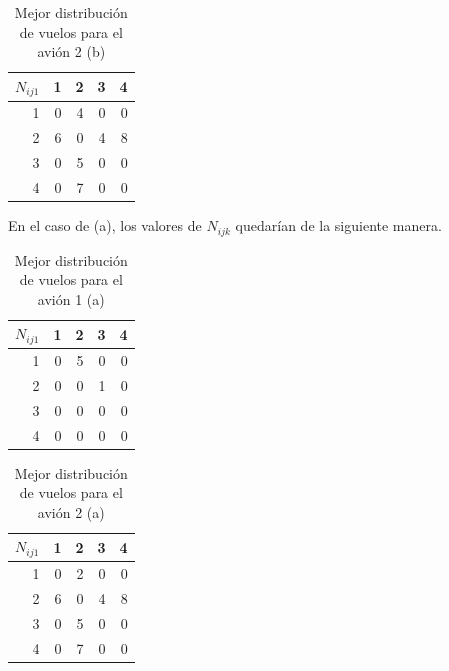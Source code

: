 \documentclass[12pt]{article}
\begin{document}
\begin{table}[ht!]
    \centering
    \begin{tabular}{r|r|r|r|r}
        $N_{ij1}$%
               &   1  &   2  &   3  &   4\\
            \hline
            \hline
             1 & 0 & 4 & 0 & 0\\
             2 & 6 & 0 & 4 & 8\\
             3 & 0 & 5 & 0 & 0\\
             4 & 0 & 7 & 0 & 0\\
    \end{tabular}
    \caption{Mejor distribución de vuelos para el avión 2 (b)}
    \label{tab:nij2b}
\end{table}

En el caso de (a), los valores de $N_{ijk}$ quedarían de la siguiente manera.

\begin{table}[ht!]
    \centering
    \begin{tabular}{r|r|r|r|r}
        $N_{ij1}$%
               &   1  &   2  &   3  &   4\\
            \hline
            \hline
             1 & 0 & 5 & 0 & 0\\
             2 & 0 & 0 & 1 & 0\\
             3 & 0 & 0 & 0 & 0\\
             4 & 0 & 0 & 0 & 0\\
    \end{tabular}
    \caption{Mejor distribución de vuelos para el avión 1 (a)}
    \label{tab:nij1a}
\end{table}

\begin{table}[ht!]
    \centering
    \begin{tabular}{r|r|r|r|r}
        $N_{ij1}$%
               &   1  &   2  &   3  &   4\\
            \hline
            \hline
             1 & 0 & 2 & 0 & 0\\
             2 & 6 & 0 & 4 & 8\\
             3 & 0 & 5 & 0 & 0\\
             4 & 0 & 7 & 0 & 0\\
    \end{tabular}
    \caption{Mejor distribución de vuelos para el avión 2 (a)}
    \label{tab:nij2a}
\end{table}
\end{document}
